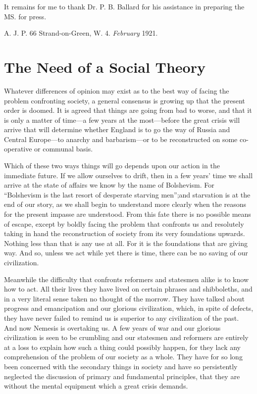 \documentclass{book}
\begin{document}
It remains for me to thank Dr. P. B. Ballard for his assistance in preparing the MS. for press.

A. J. P. 66 Strand-on-Green, W. 4. \emph{February} 1921.

\chapter{The Need of a Social Theory}
\label{chapter-1}
Whatever differences of opinion may exist as to the best way of facing the problem confronting society, a general consensus is growing up that the present order is doomed. It is agreed that things are going from bad to worse, and that it is only a matter of time—a few years at the most—before the great crisis will arrive that will determine whether England is to go the way of Russia and Central Europe—to anarchy and barbarism—or to be reconstructed on some co-operative or communal basis.

Which of these two ways things will go depends upon our action in the immediate future. If we allow ourselves to drift, then in a few years’ time we shall arrive at the state of affairs we know by the name of Bolshevism. For “Bolshevism is the last resort of desperate starving men”;\footnotemark[1] and starvation is at the end of our story, as we shall begin to understand more clearly when the reasons for the present impasse are understood. From this fate there is no possible means of escape, except by boldly facing the problem that confronts us and resolutely taking in hand the reconstruction of society from its very foundations upwards. Nothing less than that is any use at all. For it is the foundations that are giving way. And so, unless we act while yet there is time, there can be no saving of our civilization.

Meanwhile the difficulty that confronts reformers and statesmen alike is to know how to act. All their lives they have lived on certain phrases and shibboleths, and in a very literal sense taken no thought of the morrow. They have talked about progress and emancipation and our glorious civilization, which, in spite of defects, they have never failed to remind us is superior to any civilization of the past. And now Nemesis is overtaking us. A few years of war and our glorious civilization is seen to be crumbling and our statesmen and reformers are entirely at a loss to explain how such a thing could possibly happen, for they lack any comprehension of the problem of our society as a whole. They have for so long been concerned with the secondary things in society and have so persistently neglected the discussion of primary and fundamental principles, that they are without the mental equipment which a great crisis demands.
\end{document}

